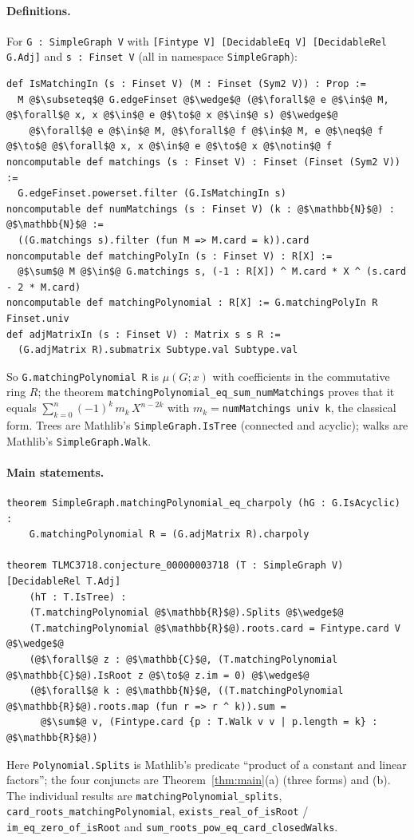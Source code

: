 \documentclass[11pt,a4paper]{article}
\theoremstyle{definition}
\theoremstyle{remark}
\begin{document}
\paragraph{Definitions.} For \texttt{G : SimpleGraph V} with \texttt{[Fintype V] [DecidableEq V]
[DecidableRel G.Adj]} and \texttt{s : Finset V} (all in namespace \texttt{SimpleGraph}):
\begin{lstlisting}
def IsMatchingIn (s : Finset V) (M : Finset (Sym2 V)) : Prop :=
  M @$\subseteq$@ G.edgeFinset @$\wedge$@ (@$\forall$@ e @$\in$@ M, @$\forall$@ x, x @$\in$@ e @$\to$@ x @$\in$@ s) @$\wedge$@
    @$\forall$@ e @$\in$@ M, @$\forall$@ f @$\in$@ M, e @$\neq$@ f @$\to$@ @$\forall$@ x, x @$\in$@ e @$\to$@ x @$\notin$@ f
noncomputable def matchings (s : Finset V) : Finset (Finset (Sym2 V)) :=
  G.edgeFinset.powerset.filter (G.IsMatchingIn s)
noncomputable def numMatchings (s : Finset V) (k : @$\mathbb{N}$@) : @$\mathbb{N}$@ :=
  ((G.matchings s).filter (fun M => M.card = k)).card
noncomputable def matchingPolyIn (s : Finset V) : R[X] :=
  @$\sum$@ M @$\in$@ G.matchings s, (-1 : R[X]) ^ M.card * X ^ (s.card - 2 * M.card)
noncomputable def matchingPolynomial : R[X] := G.matchingPolyIn R Finset.univ
def adjMatrixIn (s : Finset V) : Matrix s s R :=
  (G.adjMatrix R).submatrix Subtype.val Subtype.val
\end{lstlisting}
So \texttt{G.matchingPolynomial R} is $\mu(G;x)$ with coefficients in the commutative ring $R$;
the theorem \newline \texttt{matchingPolynomial\_eq\_sum\_numMatchings} proves that it equals
$\sum_{k=0}^{n}(-1)^k\,m_k\,X^{n-2k}$ with $m_k=$\texttt{numMatchings univ k}, the classical form.
Trees are Mathlib's \texttt{SimpleGraph.IsTree} (connected and acyclic); walks are Mathlib's
\texttt{SimpleGraph.Walk}.

\paragraph{Main statements.}
\begin{lstlisting}
theorem SimpleGraph.matchingPolynomial_eq_charpoly (hG : G.IsAcyclic) :
    G.matchingPolynomial R = (G.adjMatrix R).charpoly

theorem TLMC3718.conjecture_00000003718 (T : SimpleGraph V) [DecidableRel T.Adj]
    (hT : T.IsTree) :
    (T.matchingPolynomial @$\mathbb{R}$@).Splits @$\wedge$@
    (T.matchingPolynomial @$\mathbb{R}$@).roots.card = Fintype.card V @$\wedge$@
    (@$\forall$@ z : @$\mathbb{C}$@, (T.matchingPolynomial @$\mathbb{C}$@).IsRoot z @$\to$@ z.im = 0) @$\wedge$@
    (@$\forall$@ k : @$\mathbb{N}$@, ((T.matchingPolynomial @$\mathbb{R}$@).roots.map (fun r => r ^ k)).sum =
      @$\sum$@ v, (Fintype.card {p : T.Walk v v | p.length = k} : @$\mathbb{R}$@))
\end{lstlisting}
Here \texttt{Polynomial.Splits} is Mathlib's predicate ``product of a constant and linear
factors''; the four conjuncts are Theorem~\ref{thm:main}(a) (three forms) and (b). The individual
results are \texttt{matchingPolynomial\_splits}, \texttt{card\_roots\_matchingPolynomial},
\texttt{exists\_real\_of\_isRoot} / \texttt{im\_eq\_zero\_of\_isRoot} and
\texttt{sum\_roots\_pow\_eq\_card\_closedWalks}.
\end{document}
